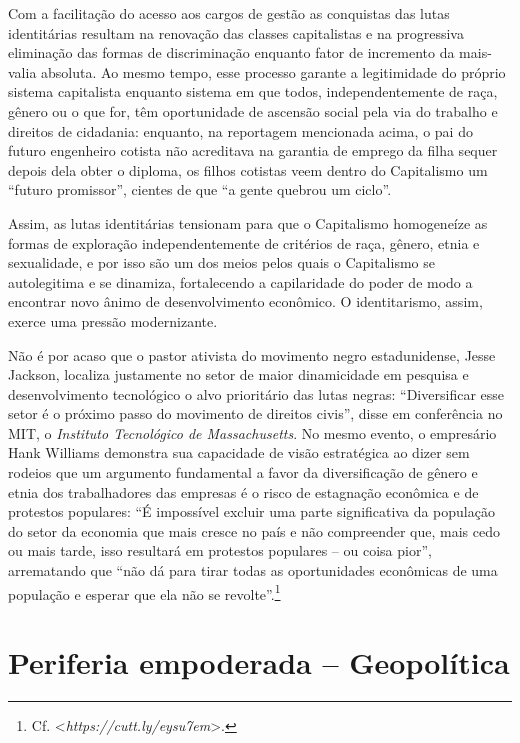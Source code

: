 Com a facilitação do acesso aos cargos de gestão as conquistas das lutas
identitárias resultam na renovação das classes capitalistas e na
progressiva eliminação das formas de discriminação enquanto fator de
incremento da mais-valia absoluta. Ao mesmo tempo, esse processo garante
a legitimidade do próprio sistema capitalista enquanto sistema em que
todos, independentemente de raça, gênero ou o que for, têm oportunidade
de ascensão social pela via do trabalho e direitos de cidadania:
enquanto, na reportagem mencionada acima, o pai do futuro engenheiro
cotista não acreditava na garantia de emprego da filha sequer depois
dela obter o diploma, os filhos cotistas veem dentro do Capitalismo um
``futuro promissor'', cientes de que ``a gente quebrou um ciclo''.

Assim, as lutas identitárias tensionam para que o Capitalismo
homogeneíze as formas de exploração independentemente de critérios de
raça, gênero, etnia e sexualidade, e por isso são um dos meios pelos
quais o Capitalismo se autolegitima e se dinamiza, fortalecendo a
capilaridade do poder de modo a encontrar novo ânimo de desenvolvimento
econômico. O identitarismo, assim, exerce uma pressão modernizante.

Não é por acaso que o pastor ativista do movimento negro estadunidense,
Jesse Jackson, localiza justamente no setor de maior dinamicidade em
pesquisa e desenvolvimento tecnológico o alvo prioritário das lutas
negras: ``Diversificar esse setor é o próximo passo do movimento de
direitos civis'', disse em conferência no MIT, o \emph{Instituto
Tecnológico de Massachusetts}. No mesmo evento, o empresário Hank
Williams demonstra sua capacidade de visão estratégica ao dizer sem
rodeios que um argumento fundamental a favor da diversificação de gênero
e etnia dos trabalhadores das empresas é o risco de estagnação econômica
e de protestos populares: ``É impossível excluir uma parte significativa
da população do setor da economia que mais cresce no país e não
compreender que, mais cedo ou mais tarde, isso resultará em protestos
populares -- ou coisa pior'', arrematando que ``não dá para tirar todas
as oportunidades econômicas de uma população e esperar que ela não se
revolte''.\footnote{Cf. \textless{}\emph{https://cutt.ly/eysu7em}\textgreater{}.}

\chapter{Periferia empoderada -- Geopolítica}

